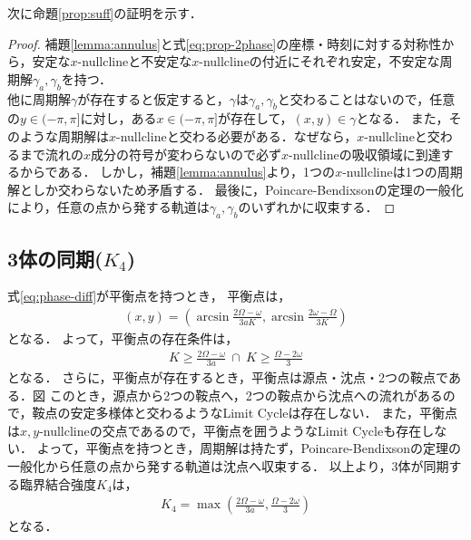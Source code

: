 \documentclass[../main]{subfiles}
\begin{document}
    次に命題\ref{prop:suff}の証明を示す．
    \begin{proof}
        補題\ref{lemma:annulus}と式\eqref{eq:prop-2phase}の座標・時刻に対する対称性から，安定な$x$-nullclineと不安定な$x$-nullclineの付近にそれぞれ安定，不安定な周期解$\gamma_a,\gamma_b$を持つ．\\
        他に周期解$\gamma$が存在すると仮定すると，$\gamma$は$\gamma_a,\gamma_b$と交わることはないので，任意の$y\in(-\pi,\pi]$に対し，ある$x\in(-\pi,\pi]$が存在して，$(x,y)\in\gamma$となる．
        また，そのような周期解は$x$-nullclineと交わる必要がある．なぜなら，$x$-nullclineと交わるまで流れの$x$成分の符号が変わらないので必ず$x$-nullclineの吸収領域に到達するからである．
        しかし，補題\ref{lemma:annulus}より，1つの$x$-nullclineは1つの周期解としか交わらないため矛盾する．
        最後に，Poincare-Bendixsonの定理の一般化により，任意の点から発する軌道は$\gamma_a,\gamma_b$のいずれかに収束する．
    \end{proof}
\subsection{3体の同期($K_4$)}
式\eqref{eq:phase-diff}が平衡点を持つとき，
平衡点は，
\begin{align*}
    (x,y)=\left(\arcsin \frac{2\Omega-\omega}{3aK},\arcsin \frac{2\omega-\Omega}{3K}\right)
\end{align*}
となる．
よって，平衡点の存在条件は，
\begin{align*}
    K\geq \frac{2\Omega-\omega}{3a}\ \cap \ K\geq \frac{\Omega-2\omega}{3}
\end{align*}
となる．
さらに，平衡点が存在するとき，平衡点は源点・沈点・2つの鞍点である．図
このとき，源点から2つの鞍点へ，2つの鞍点から沈点への流れがあるので，鞍点の安定多様体と交わるようなLimit Cycleは存在しない．
また，平衡点は$x,y$-nullclineの交点であるので，平衡点を囲うようなLimit Cycleも存在しない．
よって，平衡点を持つとき，周期解は持たず，Poincare-Bendixsonの定理の一般化から任意の点から発する軌道は沈点へ収束する．
以上より，3体が同期する臨界結合強度$K_4$は，
\begin{align*}
    K_4=\max\left(\frac{2\Omega-\omega}{3a},\frac{\Omega-2\omega}{3}\right)
\end{align*}
となる．
\end{document}
